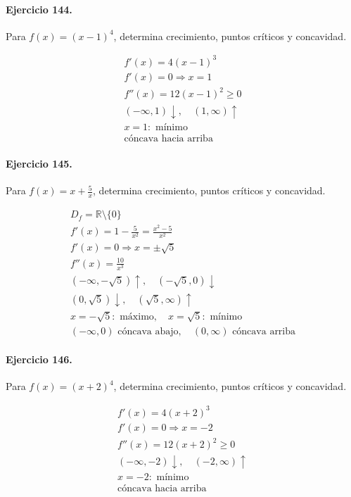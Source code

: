 \documentclass[11pt,a4paper]{article}
\begin{document}
\paragraph{Ejercicio 144.} Para $f(x)=(x-1)^4$, determina crecimiento, puntos críticos y concavidad.

\[
\begin{aligned}
f'(x)=4(x-1)^3\\
f'(x)=0\Rightarrow x=1\\
f''(x)=12(x-1)^2\ge0\\
(-\infty,1)\downarrow,\quad(1,\infty)\uparrow\\
x=1:\text{ mínimo}\\
\text{{cóncava hacia arriba}}
\end{aligned}
\]


\paragraph{Ejercicio 145.} Para $f(x)=x+\frac{5}{x}$, determina crecimiento, puntos críticos y concavidad.

\[
\begin{aligned}
D_f=\mathbb{R}\setminus\{0\}\\
f'(x)=1-\frac{5}{x^2}=\frac{x^2-5}{x^2}\\
f'(x)=0\Rightarrow x=\pm \sqrt{5}\\
f''(x)=\frac{10}{x^3}\\
(-\infty,-\sqrt{5})\uparrow,\quad(-\sqrt{5},0)\downarrow\\
(0,\sqrt{5})\downarrow,\quad(\sqrt{5},\infty)\uparrow\\
x=-\sqrt{5}:\text{ máximo},\quad x=\sqrt{5}:\text{ mínimo}\\
(-\infty,0)\text{{ cóncava abajo}},\quad(0,\infty)\text{{ cóncava arriba}}
\end{aligned}
\]


\paragraph{Ejercicio 146.} Para $f(x)=(x+2)^4$, determina crecimiento, puntos críticos y concavidad.

\[
\begin{aligned}
f'(x)=4(x+2)^3\\
f'(x)=0\Rightarrow x=-2\\
f''(x)=12(x+2)^2\ge0\\
(-\infty,-2)\downarrow,\quad(-2,\infty)\uparrow\\
x=-2:\text{ mínimo}\\
\text{{cóncava hacia arriba}}
\end{aligned}
\]
\end{document}
